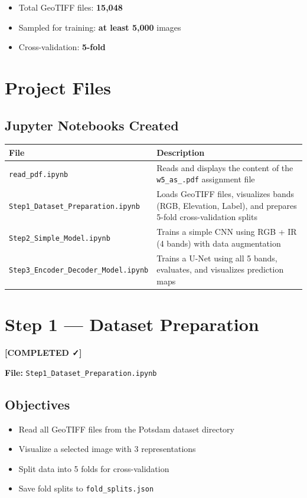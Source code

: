 \documentclass[12pt,a4paper]{article}
\begin{document}
\begin{itemize}
    \item Total GeoTIFF files: \textbf{15,048}
    \item Sampled for training: \textbf{at least 5,000} images
    \item Cross-validation: \textbf{5-fold}
\end{itemize}

\section{Project Files}

\subsection{Jupyter Notebooks Created}

\begin{center}
\begin{tabular}{l p{9cm}}
\toprule
\textbf{File} & \textbf{Description} \\
\midrule
\texttt{read\_pdf.ipynb} & Reads and displays the content of the \texttt{w5\_as\_.pdf} assignment file \\
\addlinespace
\texttt{Step1\_Dataset\_Preparation.ipynb} & Loads GeoTIFF files, visualizes bands (RGB, Elevation, Label), and prepares 5-fold cross-validation splits \\
\addlinespace
\texttt{Step2\_Simple\_Model.ipynb} & Trains a simple CNN using RGB + IR (4 bands) with data augmentation \\
\addlinespace
\texttt{Step3\_Encoder\_Decoder\_Model.ipynb} & Trains a U-Net using all 5 bands, evaluates, and visualizes prediction maps \\
\bottomrule
\end{tabular}
\end{center}

\section{Step 1 --- Dataset Preparation} \textcolor{stepcolor}{\textbf{[COMPLETED ✓]}}

\textbf{File:} \texttt{Step1\_Dataset\_Preparation.ipynb}

\subsection{Objectives}
\begin{itemize}
    \item[{\checkmark}] Read all GeoTIFF files from the Potsdam dataset directory
    \item[{\checkmark}] Visualize a selected image with 3 representations
    \item[{\checkmark}] Split data into 5 folds for cross-validation
    \item[{\checkmark}] Save fold splits to \texttt{fold\_splits.json}
\end{itemize}
\end{document}
